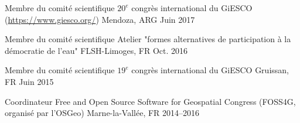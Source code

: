 \begin{cvhonors}
  \cvhonor
    {Membre du comité scientifique} %
    {$20^{e}$ congrès international du GiESCO (\url{https://www.giesco.org/})} %
    {Mendoza, ARG} %
    {Juin 2017} %

  \cvhonor
    {Membre du comité scientifique} %
    {Atelier "formes alternatives de participation à la démocratie de l'eau"} %
    {FLSH-Limoges, FR} %
    {Oct. 2016} %

  \cvhonor
    {Membre du comité scientifique} %
    {$19^{e}$ congrès international du GiESCO} %
    {Gruissan, FR} %
    {Juin 2015} %

\cvhonor
  {Coordinateur} %
  {Free and Open Source Software for Geospatial Congress (FOSS4G, organisé par l'OSGeo)} %
  {Marne-la-Vallée, FR} %
  {2014--2016} %

\end{cvhonors}
